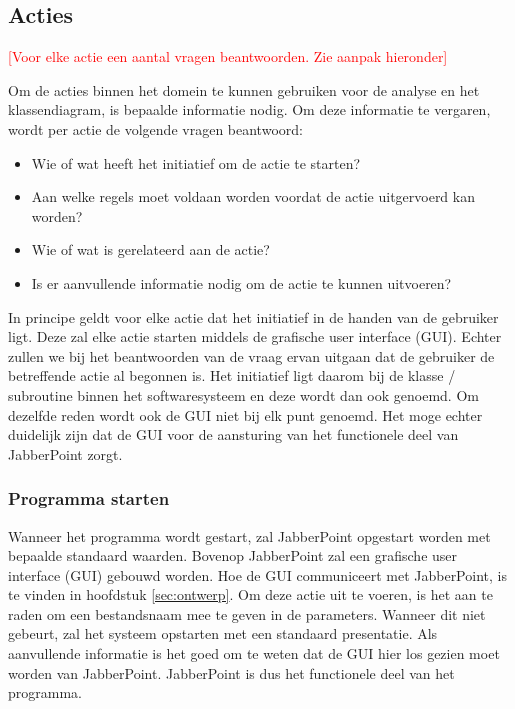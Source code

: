 \documentclass[a4paper]{article}
\newcommand{\todo}[1]{\textcolor{red}{[#1]}}
\begin{document}
\subsection{Acties}
\todo{Voor elke actie een aantal vragen beantwoorden. Zie aanpak hieronder}

Om de acties binnen het domein te kunnen gebruiken voor de analyse en het klassendiagram, is bepaalde informatie nodig. Om deze informatie te vergaren, wordt per actie de volgende vragen beantwoord:
\begin{itemize}[noitemsep]
\item Wie of wat heeft het initiatief om de actie te starten?
\item Aan welke regels moet voldaan worden voordat de actie uitgervoerd kan worden?
\item Wie of wat is gerelateerd aan de actie?
\item Is er aanvullende informatie nodig om de actie te kunnen uitvoeren?
\end{itemize}

In principe geldt voor elke actie dat het initiatief in de handen van de gebruiker ligt. Deze zal elke actie starten middels de grafische user interface (GUI). Echter zullen we bij het beantwoorden van de vraag ervan uitgaan dat de gebruiker de betreffende actie al begonnen is. Het initiatief ligt daarom bij de klasse / subroutine binnen het softwaresysteem en deze wordt dan ook genoemd. Om dezelfde reden wordt ook de GUI niet bij elk punt genoemd. Het moge echter duidelijk zijn dat de GUI voor de aansturing van het functionele deel van JabberPoint zorgt.

\subsubsection{Programma starten}
Wanneer het programma wordt gestart, zal JabberPoint opgestart worden met bepaalde standaard waarden. Bovenop JabberPoint zal een grafische user interface (GUI) gebouwd worden. Hoe de GUI communiceert met JabberPoint, is te vinden in hoofdstuk \ref{sec:ontwerp}. Om deze actie uit te voeren, is het aan te raden om een bestandsnaam mee te geven in de parameters. Wanneer dit niet gebeurt, zal het systeem opstarten met een standaard presentatie. Als aanvullende informatie is het goed om te weten dat de GUI hier los gezien moet worden van JabberPoint. JabberPoint is dus het functionele deel van het programma.
\end{document}
